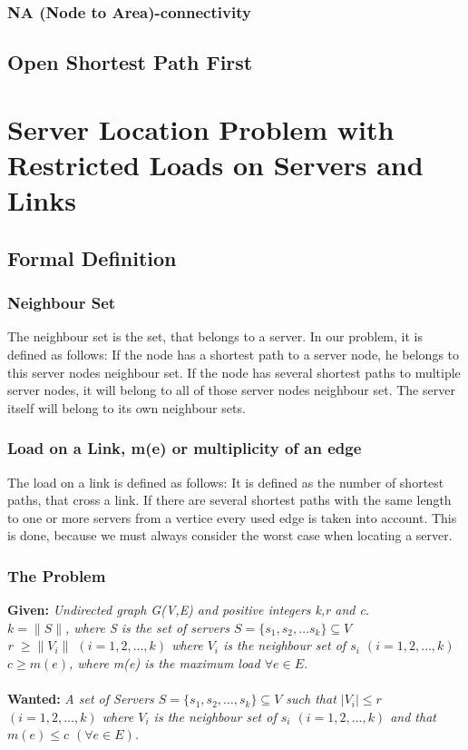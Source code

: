 \documentclass [12pt]{article}
\begin{document}
    \subsubsection {NA (Node to Area)-connectivity}
    \subsection{Open Shortest Path First}
\section{Server Location Problem with Restricted Loads on Servers and Links}
\subsection{Formal Definition}
\subsubsection{Neighbour Set}
    The neighbour set is the set, that belongs to a server. In our problem, it is
    defined as follows: If the node has a shortest path to a server node, he 
    belongs to this server nodes neighbour set. If the node has several shortest
    paths to multiple server nodes, it will belong to all of those server nodes neighbour
    set. The server itself will belong to its own neighbour sets.
    \subsubsection{Load on a Link, m(e) or multiplicity of an edge}
    The load on a link is defined as follows: 
    It is defined as the number of shortest paths, that cross a link. If there
    are several shortest paths with the same length to one or more servers from a vertice every
    used edge is taken into account. This is done, because we must always consider
    the worst case when locating a server.
    \subsubsection{The Problem}
\textbf{Given:}
{\itshape Undirected graph G(V,E) and  positive integers k,r and c. \\
$k = \|S\|$, where S is the set of servers $S = \{s_1,s_2,\dots s_k\} \subseteq V$\\
r $\geq  \|V_i\|$ $(i=1,2,\dots,k)$ where $V_i$ is the neighbour set of $s_i$ $(i=1,2,\dots,k)$\\
$c \geq m(e)$, where m(e) is the maximum load $\forall e \in E$.} \\
\\
\textbf{Wanted:} 
{\itshape A set of Servers $S = \{s_1, s_2,\dots, s_k \} \subseteq V$ such that $|V_i|\leq r$
    $(i = 1,2, \dots,k)$ where $V_i$ is the neighbour set of $s_i$  $(i = 1,2,\dots,k)$ and that
$m(e) \leq c$ $(\forall e \in E)$.}
\end{document}
